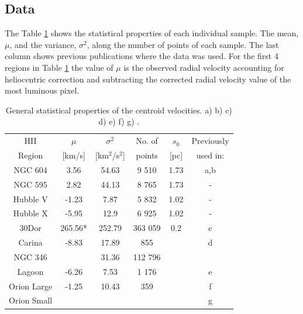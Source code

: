 \documentclass[fleqn,usenatbib, useAMS, a4paper]{mnras}
\begin{document}
\subsection{Data}

The Table \ref{tab:Data} shows the statistical properties of each individual sample.
The mean, \(\mu\), and the variance, \(\sigma^{2}\), along the number of points of each sample.
The last column shows previous publications where the data was used. For the first 4 regions in Table \ref{tab:Data} the value of \(\mu\) is the observed radial velocity accounting for heliocentric correction and subtracting the corrected radial velocity value of the most luminous pixel.


\begin{table}
  \begin{center}
    \caption{General statistical properties of the centroid velocities.
      a) \citet{tanco1997}
      b) \citet{2019arXiv191203543M}
      c) \citet{Castro:2018a}
      d) \citet{Damiani:2016a}
      e) \citet{Damiani:2017b}
      f) \citet{1987A&A...176..347H}
      g) \citet{arthur2016turbulence}.
    } 
\begin{tabular}{cccccc}\hline
HII    &  $\mu$   & $\sigma^{2}$        &  No. of  &\(s_0\)& Previously  \\
   Region       &  [km/s]  &  [km$^{2}$/s$^{2}$] &  points   &[pc]& used in:\\\hline
NGC 604   &  3.56    &    54.63            &    9 510    &1.73&  a,b     \\
NGC 595   &  2.82    &    44.13            &    8 765    &1.73&  -     \\
Hubble V  & -1.23    &    7.87             &    5 832    &1.02&   -    \\
Hubble X  & -5.95    &    12.9             &    6 925    &1.02&  -     \\
30Dor     & 265.56*  &    252.79           &    363 059    &0.2&   c    \\
Carina    & -8.83    &    17.89         &   855    &&   d    \\
NGC 346   &          &       31.36           &    112 796   &&       \\
Lagoon    & -6.26 &    7.53    &    1 176    &&   e   \\
Orion Large     &     -1.25    &     10.43    &    359    &&    f   \\
Orion Small     &         &        &        &&    g   \\
\end{tabular}\label{tab:Data}
\end{center}
\end{table} 
\end{document}
